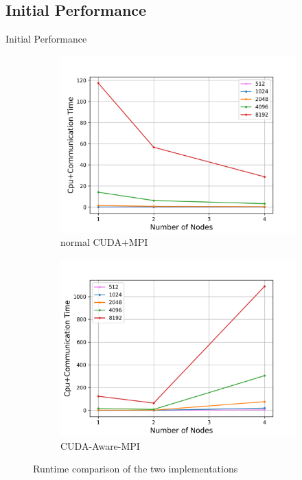 \documentclass[
  english,            %
  aspectratio=169,    %
  11pt
]{tumbeamer}
\begin{document}
\subsection{Initial Performance}
\begin{frame}{Initial Performance}
\begin{figure}[htpb]
	\centering
	\begin{subfigure}{.45\textwidth}
		\includegraphics[width=\textwidth,keepaspectratio=true]{figs/strongscalingCOMM_CUDA.png}
		\caption{normal CUDA+MPI}
		\label{fig:StrongCOMMCUDA}
	\end{subfigure}
	\begin{subfigure}{.45\textwidth}
		\centering
		\includegraphics[width=\textwidth,keepaspectratio=true]{figs/strongscalingCOMM.png}
		\caption{CUDA-Aware-MPI}
		\label{fig:StrongCOMM}
	\end{subfigure}
	\caption{Runtime comparison of the two implementations}
	\label{figs:Compare2}
\end{figure}
\end{frame}
\end{document}
